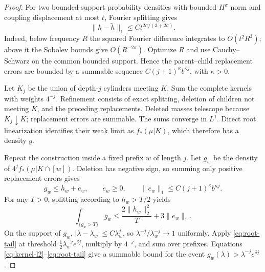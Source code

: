 \documentclass[11pt,a4paper]{amsart}
\numberwithin{equation}{section}
\theoremstyle{definition}
\begin{document}
\begin{proof}
For two bounded-support probability densities with bounded
\(H^\sigma\) norm and coupling displacement at most \(t\),
Fourier splitting gives
\begin{equation}
\|h-\widetilde h\|_1\leq C t^{2\sigma/(3+2\sigma)}.
\label{eq:kernel-interpolation}
\end{equation}
Indeed, below frequency \(R\) the squared Fourier difference
integrates to \(O(t^2R^3)\); above it the Sobolev bounds give
\(O(R^{-2\sigma})\). Optimize \(R\) and use Cauchy--Schwarz on
the common bounded support. Hence the parent--child replacement
errors are bounded by a summable sequence
\(C(j+1)^\kappa b^{\kappa j}\), with \(\kappa>0\).

Let \(K_j\) be the union of depth-\(j\) cylinders meeting \(K\).
Sum the complete kernels with weights \(4^{-j}\). Refinement
consists of exact splitting, deletion of children not meeting
\(K\), and the preceding replacements. Deleted masses telescope
because \(K_j\downarrow K\); replacement errors are summable.
The sums converge in \(L^1\). Direct root linearization identifies
their weak limit as \(f_*(\mu|K)\), which therefore has a density
\(g\).

Repeat the construction inside a fixed prefix \(w\) of length \(j\).
Let \(g_w\) be the density of \(4^j f_*(\mu|K\cap[w])\).
Deletion has negative sign, so summing only positive replacement
errors gives
\begin{equation}
g_w\leq h_w+e_w,\qquad e_w\geq0,\qquad
\|e_w\|_1\leq C(j+1)^\kappa b^{\kappa j}.
\label{eq:root-one-sided}
\end{equation}
For any \(T>0\), splitting according to \(h_w>T/2\) yields
\begin{equation}
\int_{\{g_w>T\}}g_w
\leq \frac{2\|h_w\|_2^2}{T}+3\|e_w\|_1.
\label{eq:root-tail}
\end{equation}
On the support of \(g_w\), \(|\lambda-\lambda_w|\leq C\lambda_w^j\),
so \(\lambda^{-j}/\lambda_w^{-j}\to1\) uniformly.
Apply \eqref{eq:root-tail} at threshold
\(\tfrac12\lambda_w^{-j}e^{\delta j}\), multiply by \(4^{-j}\),
and sum over prefixes. Equations \eqref{eq:kernel-l2}--\eqref{eq:root-tail}
give a summable bound for the event
\(g_w(\lambda)>\lambda^{-j}e^{\delta j}\).


\end{proof}
\end{document}
